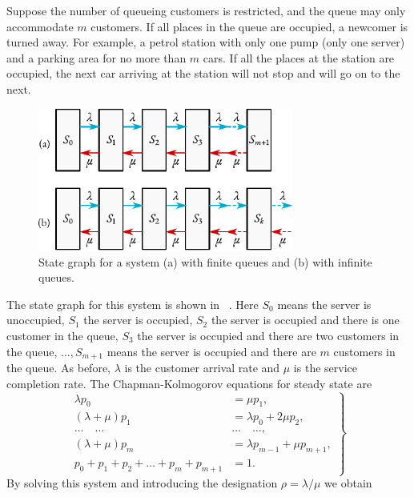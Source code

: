  Suppose	the	number of queueing customers is restricted, and the queue may only accommodate $m$ customers. If all places in the queue are occupied, a newcomer is turned away. For example, a petrol station with only one pump (only one server) and a parking area for no more than $m$ cars. If all the places at the station are occupied, the next car arriving at the station will not stop and will go on to the next.
 \begin{figure}[!h]
 \centering
 \includegraphics[width=0.75\textwidth]{figures/state-graph4.pdf}
\caption{State graph for a system (a) with finite queues and (b) with infinite queues.\label{state-graph4}}
 \end{figure}
The state graph for this system is shown in ~. Here $S_{0}$ means the server is unoccupied, $S_{1}$  the server is occupied, $S_{2}$  the server is occupied and there is one customer in the queue, $S_{3}$ the server is occupied and there are two customers in the queue, $\ldots{}, S_{m+1}$ means the server is occupied and there are $m$ customers in the queue. As before, $\lambda$ is the customer arrival rate and $\mu$ is the service completion rate. The Chapman-Kolmogorov equations for steady state are
\begin{equation}%
\left.
\begin{split}
\lambda p_{0} & = \mu p_{1},\\
(\lambda + \mu) p_{1} & = \lambda p_{0} + 2\mu p_{2},\\
\ldots{} \quad \ldots{} \quad & \ldots{} \quad \ldots{} , \\
(\lambda + \mu) p_{m} & = \lambda p_{m-1} + \mu p_{m+1},\\
p_{0} + p_{1} + p_{2} + \ldots + p_{m} + p_{m+1} & = 1.
\end{split}
\right\}
\label{eq-2.7}
\end{equation}
By solving this system and introducing the designation $\rho = \lambda/\mu$ we obtain
